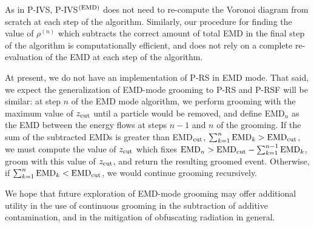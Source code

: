 As in P-IVS, P-IVS\(^{(\rm EMD)}\) does not need to re-compute the Voronoi diagram from scratch at each step of the algorithm.
%
Similarly, our procedure for finding the value of \(\rho^{(n)}\) which subtracts the correct amount of total EMD in the final step of the algorithm is computationally efficient, and does not rely on a complete re-evaluation of the EMD at each step of the algorithm.


At present, we do not have an implementation of P-RS in EMD mode.
%
That said, we expect the generalization of EMD-mode grooming to P-RS and P-RSF will be similar:
%
at step \(n\) of the EMD mode algorithm, we perform grooming with the maximum value of \(z_{\rm cut}\) until a particle would be removed, and define EMD\(_n\) as the EMD between the energy flows at steps \(n-1\) and \(n\) of the grooming.
%
If the sum of the subtracted EMDs is greater than EMD\(_{\rm cut}\), \(\sum_{k = 1}^n {\rm EMD}_k > {\rm EMD}_{\rm cut}\),
%
we must compute the value of \(z_{\rm cut}\) which fixes \({\rm EMD}_n > {\rm EMD}_{\rm cut} - \sum_{k = 1}^{n-1} {\rm EMD}_k \), groom with this value of \(z_{\rm cut}\), and return the resulting groomed event.
%
Otherwise, if \(\sum_{k = 1}^n {\rm EMD}_k < {\rm EMD}_{\rm cut}\), we would continue grooming recursively.

We hope that future exploration of EMD-mode grooming may offer additional utility in the use of continuous grooming in the subtraction of additive contamination, and in the mitigation of obfuscating radiation in general.



